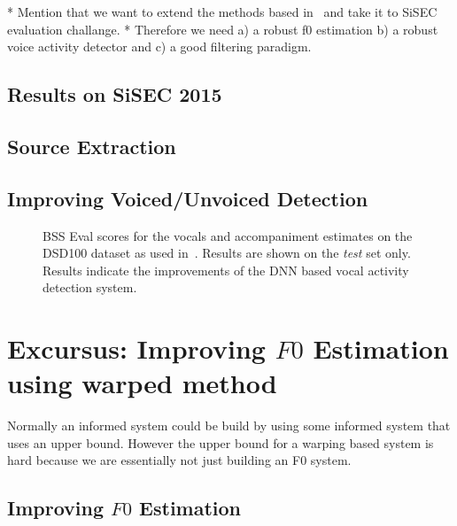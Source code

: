 * Mention that we want to extend the methods based in~\cite{stoeter14} and take it to SiSEC evaluation challange.
* Therefore we need a) a robust f0 estimation b) a robust voice activity detector and c) a good filtering paradigm.

\subsection{Results on SiSEC 2015}
\label{ssec:performance}

\subsection{Source Extraction}


\subsection{Improving Voiced/Unvoiced Detection}

\begin{figure}
  
  \caption{BSS Eval scores for the vocals and accompaniment estimates on the DSD100 dataset as used in~\cite{liutkus17}. Results are shown on the \emph{test} set only. Results indicate the improvements of the DNN based vocal activity detection system.}
  \label{fig:05_comparison_sto_stodnn}
\end{figure}

\section{Excursus: Improving $F0$ Estimation using warped method} %
\label{sec:method}

Normally an informed system could be build by using some informed system that uses an upper bound.
However the upper bound for a warping based system is hard because we are essentially not just building an F0 system.

\subsection{Improving $F0$ Estimation}


